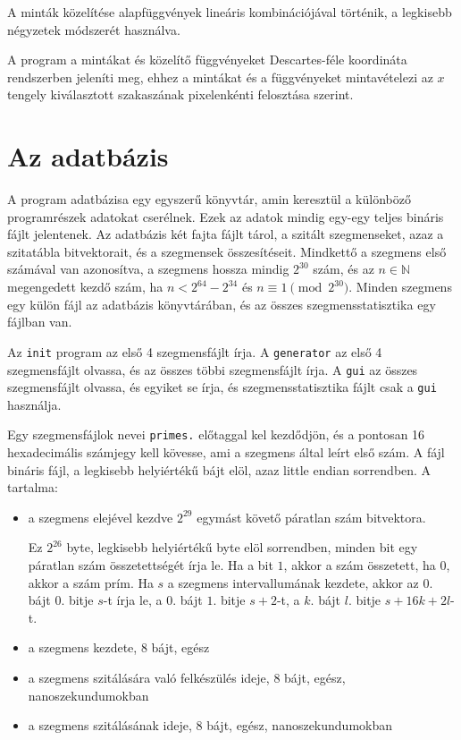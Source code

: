 A minták közelítése alapfüggvények lineáris kombinációjával történik, a legkisebb négyzetek módszerét használva.

A program a mintákat és közelítő függvényeket Descartes-féle koordináta rendszerben jeleníti meg, ehhez a mintákat és a függvényeket mintavételezi az $x$ tengely kiválasztott szakaszának pixelenkénti felosztása szerint.

\section{Az adatbázis}

A program adatbázisa egy egyszerű könyvtár, amin keresztül a különböző programrészek adatokat cserélnek.
Ezek az adatok mindig egy-egy teljes bináris fájlt jelentenek.
Az adatbázis két fajta fájlt tárol, a szitált szegmenseket, azaz a szitatábla bitvektorait, és a szegmensek összesítéseit.
Mindkettő a szegmens első számával van azonosítva, a szegmens hossza mindig $2^{30}$ szám, és az $n \in \mathbb{N}$ megengedett kezdő szám, ha $n < 2^{64}-2^{34}$ és $n \equiv 1 \pmod{2^{30}}$.
Minden szegmens egy külön fájl az adatbázis könyvtárában, és az összes szegmensstatisztika egy fájlban van.

Az \texttt{init} program az első 4 szegmensfájlt írja.
A \texttt{generator} az első 4 szegmensfájlt olvassa, és az összes többi szegmensfájlt írja.
A \texttt{gui} az összes szegmensfájlt olvassa, és egyiket se írja, és szegmensstatisztika fájlt csak a \texttt{gui} használja.

Egy szegmensfájlok nevei \texttt{primes.} előtaggal kel kezdődjön, és a pontosan 16 hexadecimális számjegy kell kövesse, ami a szegmens által leírt első szám.
A fájl bináris fájl, a legkisebb helyiértékű bájt elöl, azaz little endian sorrendben.
A tartalma:
\begin{itemize}
\item a szegmens elejével kezdve $2^{29}$ egymást követő páratlan szám bitvektora.
	
Ez $2^{26}$ byte, legkisebb helyiértékű byte elöl sorrendben, minden bit egy páratlan szám összetettségét írja le.
Ha a bit $1$, akkor a szám összetett, ha $0$, akkor a szám prím.
Ha $s$ a szegmens intervallumának kezdete, akkor az $0.$ bájt $0.$ bitje $s$-t írja le, a $0.$ bájt $1.$ bitje $s+2$-t, a $k.$ bájt $l.$ bitje $s+16k+2l$-t.
	
\item a szegmens kezdete, 8 bájt, egész
\item a szegmens szitálására való felkészülés ideje, 8 bájt, egész, nanoszekundumokban
\item a szegmens szitálásának ideje, 8 bájt, egész, nanoszekundumokban
\end{itemize}

